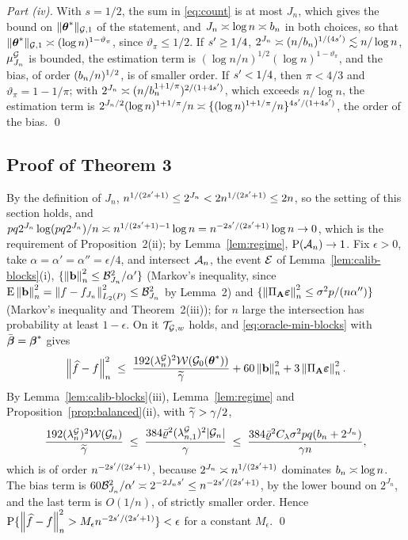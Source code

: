\emph{Part (iv).} With $s = 1/2$, the sum in \eqref{eq:count} is at most
$J_n$, which gives the bound on $\lVert \boldsymbol{\theta}^{*}\rVert_{\mathcal{G},1}$ of the statement, and
$J_n \asymp \log n \asymp b_{n}$ in both choices, so that
$\lVert \boldsymbol{\theta}^{*}\rVert_{\mathcal{G},1} \asymp (\log n)^{1-\vartheta_{\pi}}$, since
$\vartheta_{\pi} \le 1/2$. If $s' \ge 1/4$,
$2^{J_n} \asymp (n/b_{n})^{1/(4s')} \lesssim n/\log n$,
$\mu^{\mathcal{G}}_{J_n}$ is bounded, the estimation term is
$(\log n/n)^{1/2}(\log n)^{1-\vartheta_{\pi}}$, and the bias, of order
$(b_{n}/n)^{1/2}$, is of smaller order. If $s' < 1/4$, then $\pi < 4/3$ and
$\vartheta_{\pi} = 1 - 1/\pi$; with
$2^{J_n} \asymp (n/b_{n}^{1+1/\pi})^{2/(1+4s')}$, which exceeds $n/\log n$,
the estimation term is $2^{J_n/2}(\log n)^{1+1/\pi}/n \asymp
\{(\log n)^{1+1/\pi}/n\}^{4s'/(1+4s')}$, the order of the bias. \qed

\subsection*{Proof of Theorem 3}

By the definition of $J_n$, $n^{1/(2s'+1)} \le 2^{J_n} <
2n^{1/(2s'+1)} \le 2n$, so the setting of this section holds, and
$pq2^{J_n}\log(pq2^{J_n})/n \asymp n^{1/(2s'+1)-1}\log n =
n^{-2s'/(2s'+1)}\log n \to 0$, which is the requirement of
Proposition~2(ii); by Lemma~\ref{lem:regime}, $\mathrm{P}(\mathcal{A}_{n}) \to 1$. Fix
$\epsilon > 0$, take $\alpha = \alpha' = \alpha'' = \epsilon/4$, and intersect
$\mathcal{A}_{n}$, the event $\mathcal{E}$ of Lemma~\ref{lem:calib-blocks}(i),
$\{\left\lVert \mathbf{b} \right\rVert_{n}^{2} \le \mathcal{B}_{J_n}^{2}/\alpha'\}$ (Markov's inequality,
since $\mathrm{E}\left\lVert \mathbf{b} \right\rVert_{n}^{2} = \left\lVert f-f_{J_n} \right\rVert_{L_2(P)}^{2} \le
\mathcal{B}_{J_n}^{2}$ by Lemma~2) and
$\{\left\lVert \Pi_{\mathbf{A}}\boldsymbol{\varepsilon} \right\rVert_{n}^{2} \le \sigma^{2}p/(n\alpha'')\}$ (Markov's inequality and
Theorem~2(iii)); for $n$ large the intersection has probability at least
$1-\epsilon$. On it $\mathcal{T}_{\mathcal{G},w}$ holds, and \eqref{eq:oracle-min-blocks} with
$\bar{\boldsymbol{\beta}} = \boldsymbol{\beta}^{*}$ gives
\[
  \left\lVert \widehat{f}-f \right\rVert_{n}^{2} \;\le\;
  \frac{192(\lambda^{\mathcal{G}}_{n})^{2}\mathcal{W}(\mathcal{G}_{0}(\boldsymbol{\theta}^{*}))}{\widetilde{\gamma}}
  + 60\left\lVert \mathbf{b} \right\rVert_{n}^{2} + 3\left\lVert \Pi_{\mathbf{A}}\boldsymbol{\varepsilon} \right\rVert_{n}^{2}.
\]
By Lemma~\ref{lem:calib-blocks}(iii), Lemma~\ref{lem:regime} and
Proposition~\ref{prop:balanced}(ii), with $\widetilde{\gamma} > \gamma/2$,
\[
  \frac{192(\lambda^{\mathcal{G}}_{n})^{2}\mathcal{W}(\mathcal{G}_{n})}{\widetilde{\gamma}}
  \;\le\; \frac{384\bar\varrho^{2}(\lambda^{\mathcal{G}}_{n,1})^{2}|\mathcal{G}_{n}|}{\gamma}
  \;\le\; \frac{384\bar\varrho^{2}C_{\lambda}\sigma^{2}pq(b_{n} + 2^{J_n})}{\gamma n},
\]
which is of order $n^{-2s'/(2s'+1)}$, because
$2^{J_n} \asymp n^{1/(2s'+1)}$ dominates $b_{n} \asymp \log n$. The bias term
is $60\mathcal{B}_{J_n}^{2}/\alpha' \asymp 2^{-2J_ns'} \le
n^{-2s'/(2s'+1)}$, by the lower bound on $2^{J_n}$, and the last term is
$O(1/n)$, of strictly smaller order. Hence
$\mathrm{P}\{\left\lVert \widehat{f}-f \right\rVert_{n}^{2} > M_\epsilon n^{-2s'/(2s'+1)}\} <
\epsilon$ for a constant $M_\epsilon$. \qed

